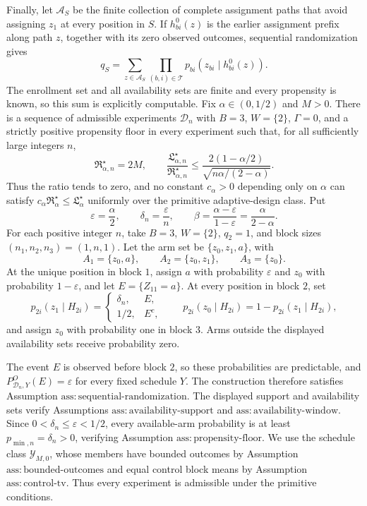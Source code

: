 Finally, let \(\mathcal A_S\) be the finite collection of complete assignment paths that avoid assigning \(z_1\) at every position in \(S\).  If \(h^0_{bi}(z)\) is the earlier assignment prefix along path \(z\), together with its zero observed outcomes, sequential randomization gives
\[
 q_S
 =\sum_{z\in\mathcal A_S}
   \prod_{(b,i)\in\mathcal T}
   p_{bi}(z_{bi}\mid h^0_{bi}(z)).
\]
The enrollment set and all availability sets are finite and every propensity is known, so this sum is explicitly computable.
Fix \(\alpha\in(0,1/2)\) and \(M>0\).  There is a sequence of admissible experiments \(\mathcal D_n\) with \(B=3\), \(W=\{2\}\), \(\Gamma=0\), and a strictly positive propensity floor in every experiment such that, for all sufficiently large integers \(n\),
\[
 \mathfrak R_{\alpha,n}^\star=2M,
 \qquad
 \frac{\mathfrak L_{\alpha,n}^\star}{\mathfrak R_{\alpha,n}^\star}
 \le
 \frac{2(1-\alpha/2)}{\sqrt{n\alpha/(2-\alpha)}}.
\]
Thus the ratio tends to zero, and no constant \(c_\alpha>0\) depending only on \(\alpha\) can satisfy \(c_\alpha\mathfrak R_\alpha^\star\le\mathfrak L_\alpha^\star\) uniformly over the primitive adaptive-design class.
Put
\[
 \varepsilon=\frac{\alpha}{2},
 \qquad
 \delta_n=\frac{\varepsilon}{n},
 \qquad
 \beta=\frac{\alpha-\varepsilon}{1-\varepsilon}
       =\frac{\alpha}{2-\alpha}.
\]
For each positive integer \(n\), take \(B=3\), \(W=\{2\}\), \(q_2=1\), and block sizes \((n_1,n_2,n_3)=(1,n,1)\).  Let the arm set be \(\{z_0,z_1,a\}\), with
\[
 A_1=\{z_0,a\},
 \qquad
 A_2=\{z_0,z_1\},
 \qquad
 A_3=\{z_0\}.
\]
At the unique position in block \(1\), assign \(a\) with probability \(\varepsilon\) and \(z_0\) with probability \(1-\varepsilon\), and let \(E=\{Z_{11}=a\}\).  At every position in block \(2\), set
\[
 p_{2i}(z_1\mid H_{2i})=
 \begin{cases}
  \delta_n,&E,\\
  1/2,&E^c,
 \end{cases}
 \qquad
 p_{2i}(z_0\mid H_{2i})=1-p_{2i}(z_1\mid H_{2i}),
\]
and assign \(z_0\) with probability one in block \(3\).  Arms outside the displayed availability sets receive probability zero.

The event \(E\) is observed before block \(2\), so these probabilities are predictable, and \(P^O_{\mathcal D_n,Y}(E)=\varepsilon\) for every fixed schedule \(Y\).  The construction therefore satisfies Assumption \(\mathrm{ass:sequential\text{-}randomization}\).  The displayed support and availability sets verify Assumptions \(\mathrm{ass:availability\text{-}support}\) and \(\mathrm{ass:availability\text{-}window}\).  Since \(0<\delta_n\le\varepsilon<1/2\), every available-arm probability is at least \(p_{\min,n}=\delta_n>0\), verifying Assumption \(\mathrm{ass:propensity\text{-}floor}\).  We use the schedule class \(\mathcal Y_{M,0}\), whose members have bounded outcomes by Assumption \(\mathrm{ass:bounded\text{-}outcomes}\) and equal control block means by Assumption \(\mathrm{ass:control\text{-}tv}\).  Thus every experiment is admissible under the primitive conditions.

